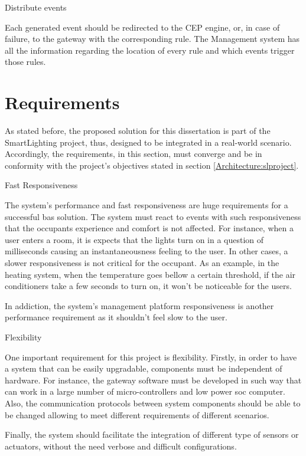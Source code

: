 \begin{Paragraph}{Distribute events}
	
Each generated event should be redirected to the CEP engine, or, in case of failure, to the gateway with the corresponding rule. The Management system has all the information regarding the location of every rule and which events trigger those rules. 
	
\end{Paragraph}

\fi 



\section{Requirements}
\label{Architecture:Requirements}
As stated before, the proposed solution for this dissertation is part of the SmartLighting project, thus, designed to be integrated in a real-world scenario. Accordingly, the requirements, in this section, must converge and be in conformity with the project's objectives stated in section \ref{Architecture:slproject}. 

\begin{Paragraph}{Fast Responsiveness}

The system's performance and fast responsiveness are huge requirements for a successful \ac{bas} solution. The system must react to events with such responsiveness that the occupants experience and comfort is not affected. For instance, when a user enters a room, it is expects that the lights turn on in a question of milliseconds causing an instantaneousness feeling to the user. In other cases, a slower responsiveness is not critical for the occupant. As an example, in the heating system, when the temperature goes bellow a certain threshold, if the air conditioners take a few seconds to turn on, it won't be noticeable for the users.

In addiction, the system's management platform responsiveness is another performance requirement as it shouldn't feel slow to the user.

\end{Paragraph}

\begin{Paragraph}{Flexibility}

One important requirement for this project is flexibility. Firstly, in order to have a system that can be easily upgradable, components must be independent of hardware. For instance, the gateway software must be developed in such way that can work in a large number of micro-controllers and  low power \ac{soc} computer. Also, the communication protocols between system components should be able to be changed allowing to meet different requirements of different scenarios. 


Finally, the system should facilitate the integration of different type of sensors or actuators, without the need verbose and difficult configurations.

\end{Paragraph}

